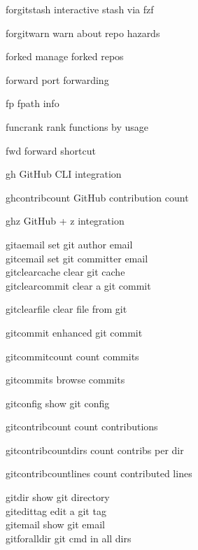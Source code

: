 \documentclass[11pt,a4paper,twoside]{book}
\begin{document}
forgitstash                interactive stash via fzf

forgitwarn                 warn about repo hazards

forked                     manage forked repos

forward                    port forwarding

fp                         fpath info

funcrank                   rank functions by usage

fwd                        forward shortcut

gh                         GitHub CLI integration

ghcontribcount             GitHub contribution count

ghz                        GitHub + z integration

\begin{codebox}
gitaemail                  set git author email\\
gitcemail                  set git committer email\\
gitclearcache              clear git cache\\
gitclearcommit             clear a git commit\\
\end{codebox}

gitclearfile               clear file from git

\begin{codebox}
gitcommit                  enhanced git commit\\
\end{codebox}

gitcommitcount             count commits

gitcommits                 browse commits

\begin{codebox}
gitconfig                  show git config\\
\end{codebox}

gitcontribcount            count contributions

gitcontribcountdirs        count contribs per dir

gitcontribcountlines       count contributed lines

\begin{codebox}
gitdir                     show git directory\\
gitedittag                 edit a git tag\\
gitemail                   show git email\\
gitforalldir               git cmd in all dirs\\
\end{codebox}
\end{document}
